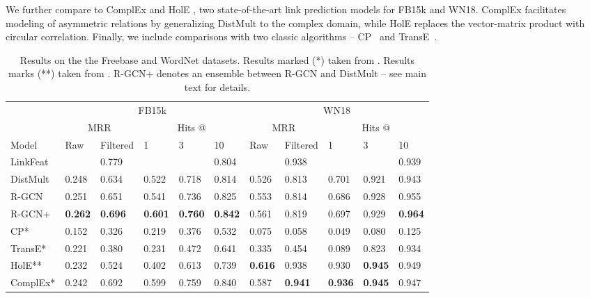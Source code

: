 We further compare to ComplEx \cite{complex-complex_embeddings_for_simple_link_prediction} and HolE \cite{nickel2015holographic}, two state-of-the-art link prediction models for FB15k and WN18. ComplEx facilitates modeling of asymmetric relations by generalizing DistMult to the complex domain, while HolE replaces the vector-matrix product with circular correlation. Finally, we include comparisons with two classic algorithms -- CP~\cite{hitchcock1927expression} and TransE~\cite{bordes2013translating}.

\begin{table}[t!]
\centering
\begin{tabular}{@{}lllllllllll@{}}
\toprule
      & \multicolumn{5}{c}{FB15k}                             & \multicolumn{5}{c}{WN18}                            \\ \cmidrule(lr){2-6} \cmidrule(l){7-11}
      & \multicolumn{2}{c}{MRR} & \multicolumn{3}{c}{Hits @} & \multicolumn{2}{c}{MRR} & \multicolumn{3}{c}{Hits @} \\ \cmidrule(lr){2-3} \cmidrule(lr){4-6} \cmidrule(lr){7-8} \cmidrule(l){9-11}
Model & Raw      & Filtered     & 1       & 3      & 10      & Raw      & Filtered     & 1       & 3      & 10      \\ \midrule
LinkFeat 		&  & 0.779 & & & 0.804 & & 0.938 & & & 0.939 \\
\midrule
DistMult 		& 0.248 & 0.634 & 0.522 & 0.718 & 0.814 & 0.526 & 0.813 & 0.701 & 0.921 & 0.943 \\
R-GCN  			& 0.251 & 0.651 & 0.541 & 0.736 & 0.825 & 0.553 & 0.814 & 0.686 & 0.928 & 0.955 \\
R-GCN+			& \textbf{0.262} & \textbf{0.696} & \textbf{0.601} & \textbf{0.760} & \textbf{0.842} & 0.561 & 0.819 & 0.697 & 0.929 & \textbf{0.964}  \\ \midrule
CP* & 0.152 & 0.326 & 0.219 & 0.376 & 0.532 & 0.075 & 0.058 & 0.049 & 0.080 & 0.125 \\
TransE* 		& 0.221 & 0.380 & 0.231 & 0.472 & 0.641 & 0.335 & 0.454 & 0.089 & 0.823 & 0.934 \\
HolE** 			& 0.232 & 0.524 & 0.402 & 0.613 & 0.739 & \textbf{0.616} & 0.938 & 0.930 & \textbf{0.945} & 0.949\\
ComplEx* 		& 0.242 & 0.692 & 0.599 & 0.759 & 0.840 & 0.587 & \textbf{0.941} & \textbf{0.936} & \textbf{0.945} & 0.947 \\ \bottomrule
\end{tabular}
\caption{Results on the the Freebase and WordNet datasets. Results marked (*) taken from \citet{complex-complex_embeddings_for_simple_link_prediction}. Results marks (**) taken from \citet{nickel2015holographic}. R-GCN+ denotes an ensemble between R-GCN and DistMult -- see main text for details.}
\label{table:link-results}
\end{table}

